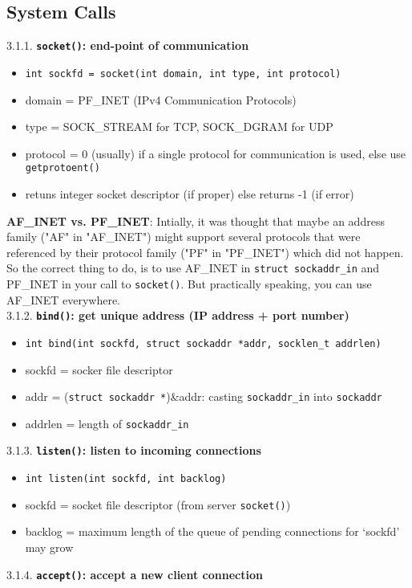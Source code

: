 \documentclass[10pt]{article}
\begin{document}
\subsection{System Calls}
3.1.1. \textbf{\texttt{socket()}: end-point of communication}
\begin{itemize}
\item \texttt{int sockfd = socket(int domain, int type, int protocol)}
\item domain = PF\_INET (IPv4 Communication Protocols)
\item type = SOCK\_STREAM for TCP, SOCK\_DGRAM for UDP
\item protocol = 0 (usually) if a single protocol for communication is used, else use \texttt{getprotoent()}
\item retuns integer socket descriptor (if proper) else returns -1 (if error)
\end{itemize}
\textbf{AF\_INET vs. PF\_INET}: Intially, it was thought that maybe an address family ("AF" in "AF\_INET") might support several protocols that were referenced by their protocol family ("PF" in "PF\_INET") which did not happen. So the correct thing to do, is to use AF\_INET in  \texttt{struct sockaddr\_in} and PF\_INET in your call to \texttt{socket()}. But practically speaking, you can use AF\_INET everywhere.
\vspace{2mm}
\\3.1.2. \textbf{\texttt{bind()}: get unique address (IP address + port number)}
\begin{itemize}
\item \texttt{int bind(int sockfd, struct sockaddr *addr, socklen\_t addrlen)}
\item sockfd = socker file descriptor
\item addr = (\texttt{struct sockaddr *})\&addr: casting \texttt{sockaddr\_in} into \texttt{sockaddr} 
\item addrlen = length of \texttt{sockaddr\_in}
\end{itemize}
3.1.3. \textbf{\texttt{listen()}: listen to incoming connections}
\begin{itemize}
\item \texttt{int listen(int sockfd, int backlog)}
\item sockfd = socket file descriptor (from server \texttt{socket()})
\item backlog = maximum length of the queue of pending connections for `sockfd' may grow
\end{itemize}
3.1.4. \textbf{\texttt{accept()}: accept a new client connection}
\end{document}
